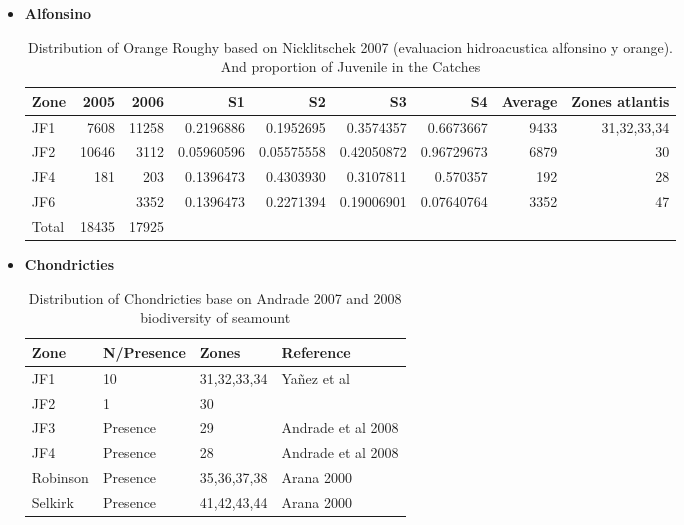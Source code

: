 \documentclass[11pt]{article}
\begin{document}
\begin{itemize}
\begin{itemize}
\begin{itemize}
\item \textbf{Alfonsino}
\begin{table}[htb]
\caption{Distribution of Orange Roughy based on Nicklitschek 2007 (evaluacion hidroacustica alfonsino y orange). And proportion of Juvenile in the Catches}
\begin{center}
\begin{tabular}{lrrrrrrrr}
 Zone   &   2005  &   2006  &          S1  &          S2  &          S3  &          S4  &  Average  &  Zones atlantis  \\
\hline
 JF1    &   7608  &  11258  &   0.2196886  &   0.1952695  &   0.3574357  &   0.6673667  &     9433  &     31,32,33,34  \\
 JF2    &  10646  &   3112  &  0.05960596  &  0.05575558  &  0.42050872  &  0.96729673  &     6879  &              30  \\
 JF4    &    181  &    203  &   0.1396473  &   0.4303930  &   0.3107811  &    0.570357  &      192  &              28  \\
 JF6    &         &   3352  &   0.1396473  &   0.2271394  &  0.19006901  &  0.07640764  &     3352  &              47  \\
\hline
 Total  &  18435  &  17925  &              &              &              &              &           &                  \\
\hline
\end{tabular}
\end{center}
\end{table}

\item \textbf{Chondricties}
\begin{table}[htb]
\caption{Distribution of Chondricties base on Andrade 2007 and 2008 biodiversity of seamount}
\begin{center}
\begin{tabular}{llll}
 Zone      &  N/Presence  &  Zones        &  Reference           \\
\hline
 JF1       &  10          &  31,32,33,34  &  Yañez et al         \\
 JF2       &  1           &  30           &                      \\
 JF3       &  Presence    &  29           &  Andrade et al 2008  \\
 JF4       &  Presence    &  28           &  Andrade et al 2008  \\
 Robinson  &  Presence    &  35,36,37,38  &  Arana  2000         \\
 Selkirk   &  Presence    &  41,42,43,44  &  Arana 2000          \\
\end{tabular}
\end{center}
\end{table}


\end{itemize}
\end{itemize}
\end{itemize}
\end{document}
